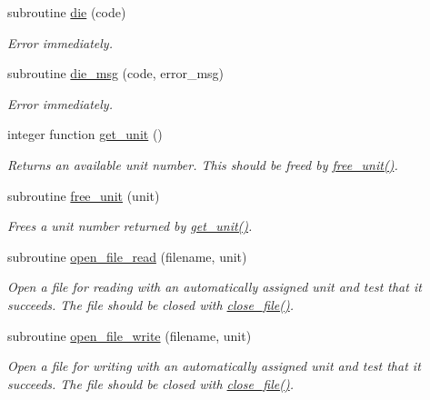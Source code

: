 \begin{DoxyCompactItemize}
subroutine \mbox{\hyperlink{namespacepmc__util_ae2f8c4238f51e70e793d1572c823fef6}{die}} (code)
\begin{DoxyCompactList}\small\item\em Error immediately. \end{DoxyCompactList}\item 
subroutine \mbox{\hyperlink{namespacepmc__util_aa6e9ef9e9da5f7b7f100405b86c74316}{die\+\_\+msg}} (code, error\+\_\+msg)
\begin{DoxyCompactList}\small\item\em Error immediately. \end{DoxyCompactList}\item 
integer function \mbox{\hyperlink{namespacepmc__util_a76442600ebd1117db2a8db91d73f7737}{get\+\_\+unit}} ()
\begin{DoxyCompactList}\small\item\em Returns an available unit number. This should be freed by \mbox{\hyperlink{namespacepmc__util_a74557f04ac600442864bec92848b4550}{free\+\_\+unit()}}. \end{DoxyCompactList}\item 
subroutine \mbox{\hyperlink{namespacepmc__util_a74557f04ac600442864bec92848b4550}{free\+\_\+unit}} (unit)
\begin{DoxyCompactList}\small\item\em Frees a unit number returned by \mbox{\hyperlink{namespacepmc__util_a76442600ebd1117db2a8db91d73f7737}{get\+\_\+unit()}}. \end{DoxyCompactList}\item 
subroutine \mbox{\hyperlink{namespacepmc__util_aee3183d5ad7cf9bf38f966a4aecee252}{open\+\_\+file\+\_\+read}} (filename, unit)
\begin{DoxyCompactList}\small\item\em Open a file for reading with an automatically assigned unit and test that it succeeds. The file should be closed with \mbox{\hyperlink{namespacepmc__util_ac91736b4f44a1623208ebe7f161e84ad}{close\+\_\+file()}}. \end{DoxyCompactList}\item 
subroutine \mbox{\hyperlink{namespacepmc__util_ab49e2a7d4958cc13e35bb5982d378da5}{open\+\_\+file\+\_\+write}} (filename, unit)
\begin{DoxyCompactList}\small\item\em Open a file for writing with an automatically assigned unit and test that it succeeds. The file should be closed with \mbox{\hyperlink{namespacepmc__util_ac91736b4f44a1623208ebe7f161e84ad}{close\+\_\+file()}}. \end{DoxyCompactList}\item 

\end{DoxyCompactItemize}
